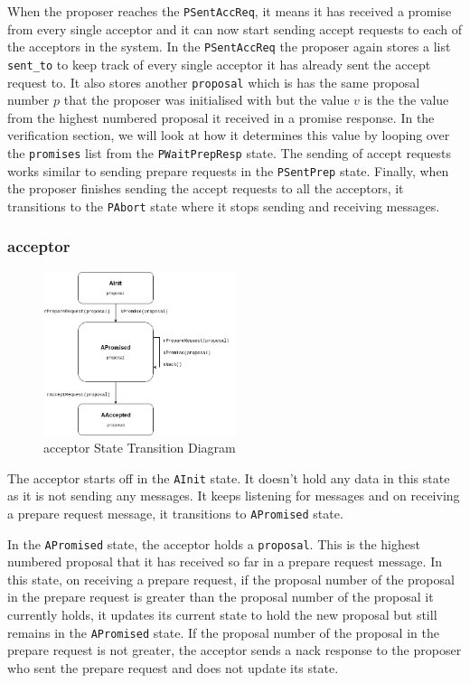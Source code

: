 When the proposer reaches the \texttt{PSentAccReq}, it means it has received a promise
from every single acceptor and it can now start sending accept requests to each
of the acceptors in the system. In the \texttt{PSentAccReq} the proposer again stores
a list \texttt{sent\_to} to keep track of every single acceptor it has already sent the
accept request to. It also stores another \texttt{proposal} which is has the same
proposal number $p$ that the proposer was initialised with but the value $v$ is the
the value from the highest numbered proposal it received in a promise response.
In the verification section, we will look at how it determines this value by looping over
the \texttt{promises} list from the \texttt{PWaitPrepResp} state. The sending of
accept requests works similar to sending prepare requests in the
\texttt{PSentPrep} state. Finally, when the proposer finishes sending the
accept requests to all the acceptors, it transitions to the \texttt{PAbort}
state where it stops sending and receiving messages.


\subsubsection{acceptor}
\begin{figure}
\centering
\includegraphics[width=0.5\textwidth]{figures/acceptor_state_transitions.png}
\caption{acceptor State Transition Diagram
\label{fig:myInlineFigure}}
\end{figure}

The acceptor starts off in the \texttt{AInit} state. It doesn't hold any data
in this state as it is not sending any messages. It keeps listening for messages
and on receiving a prepare request message, it transitions to \texttt{APromised}
state.

In the \texttt{APromised} state, the acceptor holds a \texttt{proposal}. This is
the highest numbered proposal that it has received so far in a prepare request
message. In this state, on receiving a prepare request, if the proposal number
of the proposal in the prepare request is greater than the proposal number of
the proposal it currently holds, it updates its current state to hold the new
proposal but still remains in the \texttt{APromised} state. If the proposal
number of the proposal in the prepare request is not greater, the acceptor
sends a nack response to the proposer who sent the prepare request and does not
update its state.

